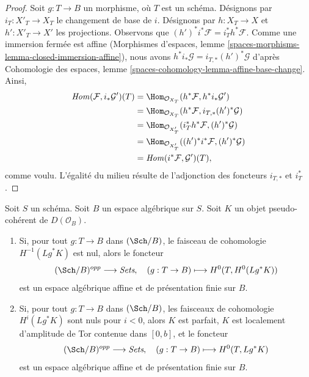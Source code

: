 \begin{proof}
Soit $g : T \to B$ un morphisme, où $T$ est un schéma. Désignons par
$i_T : X'_T \to X_T$ le changement de base de $i$. Désignons par
$h : X_T \to X$ et $h' : X'_T \to X'$ les projections. Observons que
$(h')^*i^*\mathcal{F} = i_T^*h^*\mathcal{F}$. Comme une immersion fermée est
affine (Morphismes d'espaces, lemme
\ref{spaces-morphisms-lemma-closed-immersion-affine}), nous avons
$h^*i_*\mathcal{G} = i_{T, *}(h')^*\mathcal{G}$ d'après Cohomologie des
espaces, lemme \ref{spaces-cohomology-lemma-affine-base-change}. Ainsi,
\begin{align*}
\mathit{Hom}(\mathcal{F}, i_*\mathcal{G}')(T)
& =
\Hom_{\mathcal{O}_{X_T}}(h^*\mathcal{F}, h^*i_*\mathcal{G}') \\
& =
\Hom_{\mathcal{O}_{X_T}}(h^*\mathcal{F}, i_{T, *}(h')^*\mathcal{G}) \\
& =
\Hom_{\mathcal{O}_{X'_T}}(i_T^*h^*\mathcal{F}, (h')^*\mathcal{G}) \\
& =
\Hom_{\mathcal{O}_{X'_T}}((h')^*i^*\mathcal{F}, (h')^*\mathcal{G}) \\
& =
\mathit{Hom}(i^*\mathcal{F}, \mathcal{G}')(T),
\end{align*}
comme voulu. L'égalité du milieu résulte de l'adjonction des foncteurs
$i_{T, *}$ et $i_T^*$.
\end{proof}

\begin{lemma}
\label{lemma-cohomology-perfect-complex}
Soit $S$ un schéma. Soit $B$ un espace algébrique sur $S$. Soit $K$ un objet
pseudo-cohérent de $D(\mathcal{O}_B)$.
\begin{enumerate}
\item Si, pour tout $g : T \to B$ dans $(\Sch/B)$, le faisceau de cohomologie
$H^{-1}(Lg^*K)$ est nul, alors le foncteur
$$
(\Sch/B)^{opp} \longrightarrow \textit{Sets},\quad
(g : T \to B) \longmapsto H^0(T, H^0(Lg^*K))
$$
est un espace algébrique affine et de présentation finie sur $B$.
\item Si, pour tout $g : T \to B$ dans $(\Sch/B)$, les faisceaux de
cohomologie $H^i(Lg^*K)$ sont nuls pour $i < 0$, alors $K$ est parfait,
$K$ est localement d'amplitude de Tor contenue dans $[0, b]$, et le foncteur
$$
(\Sch/B)^{opp} \longrightarrow \textit{Sets},\quad
(g : T \to B) \longmapsto H^0(T, Lg^*K)
$$
est un espace algébrique affine et de présentation finie sur $B$.
\end{enumerate}
\end{lemma}

